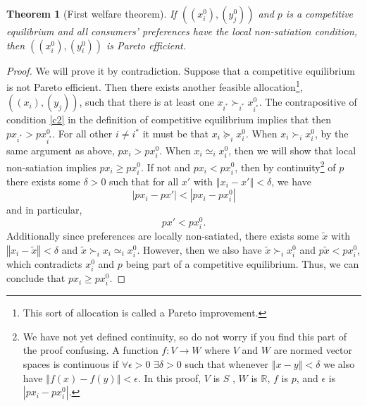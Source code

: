 \documentclass[12pt,reqno]{amsart}
\newtheorem{theorem}{Theorem}[section]
\theoremstyle{definition}
\def\R{\mathbb{R}}
\newcommand{\norm}[1]{\left\Vert {#1} \right\Vert}
\newcommand{\prefeq}{\succeq}
\newcommand{\pref}{\succ}
\begin{document}
\begin{theorem}[First welfare theorem]
  If $((x_i^0),(y^0_j))$ and $p$ is a competitive equilibrium and all
  consumers' preferences have the local non-satiation condition, then
  $((x^0_i),(y^0_i))$ is Pareto efficient.
\end{theorem}
\begin{proof}
  We will prove it by contradiction. Suppose that a competitive
  equilibrium is not Pareto efficient. Then there exists another
  feasible allocation\footnote{This sort of allocation is called a
    Pareto improvement.}, $((x_i),(y_j))$, such that there is at least
  one $x_{i^*} \pref_{i^*} x_{i^*}^0$. The contrapositive of condition
  \ref{c2} in the definition of competitive equilibrium implies that
  then $p x_{i^*} > p x_{i^*}^0$.  For all other $i \neq i^*$ it must
  be that $x_i \prefeq_i x_i^0$. When $x_i \pref_i x_i^0$, by the same
  argument as above, $p x_i > p x_i^0$. When $x_i \simeq_i x_i^0$,
  then we will show that local non-satiation implies $px_i \geq
  px_i^0$. If not and $px_i < p x_i^0$, then by continuity\footnote{We
    have not yet defined continuity, so do not worry if you find this
    part of the proof confusing. A function $f: V\rightarrow W$ where
    $V$ and $W$ are normed vector spaces is continuous if $\forall
    \epsilon > 0$ $\exists \delta > 0$ such that whenever $\norm{x -
      y}<\delta$ we also have $\norm{f(x) - f(y)} < \epsilon$. In this
    proof, $V$ is $S$ , $W$ is $\R$, $f$ is $p$, and $\epsilon$ is
    $|px_i - px_i^0|$. } of $p$ there exists some $\delta > 0$ such
  that for all $x'$ with $\norm{x_i - x'} < \delta$, we have
  \[ | p x_i - p x' | < | px_i - p x_i^0| \]
  and in particular, 
  \[ p x' < px_i^0. \]
  Additionally since preferences are locally non-satiated, there
  exists some $\tilde{x}$ with $\norm{x_i - \tilde{x}}<\delta$ and
  $\tilde{x} \pref_i x_i \simeq_i x_i^0$. However, then we also have
  $\tilde{x} \pref_i x_i^0$ and $p \tilde{x} < p x_i^0$, which contradicts
  $x_i^0$  and $p$ being part of a competitive equilibrium. Thus, we
  can conclude that $p x_i \geq p x_i^0$.


\end{proof}
\end{document}
